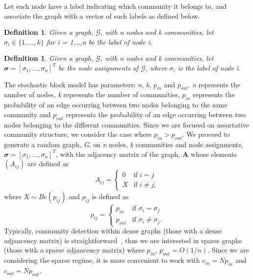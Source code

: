 \documentclass[12pt]{article}
\numberwithin{equation}{section}
\newtheorem{definition}[theorem]{Definition}
\begin{document}
Let each node have a label indicating which community it belongs to, and associate the graph with a vector of such labels as defined below.
\begin{definition}
\label{def:nodeLabel}
	Given a graph, $\mathcal{G}$, with n nodes and k communities, let $\sigma_{i} \in \{1,\dots,k\}$ for i = 1,\dots,n be the label of node i.
\end{definition}
\begin{definition}
\label{def:nodeAssignments}
	Given a graph, $\mathcal{G}$, with n nodes and k communities, let $\mathbfit{\sigma} = [\sigma_{1},\dots,\sigma_{n}]^{T}$ be the node assignments of $\mathcal{G}$, where $\sigma_{i}$ is the label of node i.
\end{definition}
The stochastic block model has parameters: \textsl{n}, \textsl{k}, \textsl{$p_{in}$} and \textsl{$p_{out}$}. \textsl{n} represents the number of nodes, \textsl{k} represents the number of communities, \textsl{$p_{in}$} represents the probability of an edge occurring between two nodes belonging to the same community and \textsl{$p_{out}$} represents the probability of an edge occurring between two nodes belonging to the different communities. Since we are focused on assortative community structure, we consider the case where $p_{in} > p_{out}$. We proceed to generate a random graph, \textsl{G}, on \textsl{n} nodes, \textsl{k} communities and node assignments, \textsl{$\mathbfit{\sigma} = [\sigma_{1},\dots,\sigma_{n}]^{T}$}, with the adjacency matrix of the graph, $\mathbf{A}$ whose elements $(A_{ij})$ are defined as
\begin{equation*}
	A_{ij} =
	\begin{cases}
		 0 & \text{if } i = j\\
		X & \text{if } i \neq j,
	\end{cases}
\end{equation*}
where $X \sim Be(p_{ij})$ and \textsl{$p_{ij}$} is defined as
\begin{equation*}
	p_{ij} =
	\begin{cases}
		p_{in} & \text{if } \sigma_{i} = \sigma_{j}\\
		p_{out} & \text{if } \sigma_{i} \neq \sigma_{j}.
	\end{cases}
\end{equation*}
Typically, community detection within dense graphs (those with a dense adjancency matrix) is straightforward~\cite{DKM+13}, thus we are interested in sparse graphs (those with a sparse adjancency matrix) where $p_{in}$, $p_{out} = O(1/n)$. Since we are considering the sparse regime, it is more convenient to work with $c_{in} = Np_{in}$ and $c_{out} = Np_{out}$.
\end{document}
